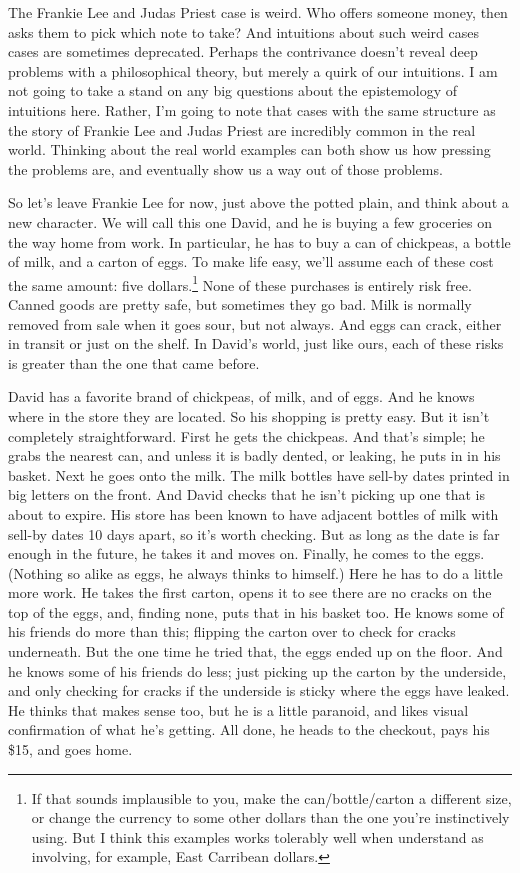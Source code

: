 \documentclass[
  10pt,
  letterpaper,
  DIV=11,
  numbers=noendperiod,
  twoside]{scrartcl}
\begin{document}
The Frankie Lee and Judas Priest case is weird. Who offers someone
money, then asks them to pick which note to take? And intuitions about
such weird cases cases are sometimes deprecated. Perhaps the contrivance
doesn't reveal deep problems with a philosophical theory, but merely a
quirk of our intuitions. I am not going to take a stand on any big
questions about the epistemology of intuitions here. Rather, I'm going
to note that cases with the same structure as the story of Frankie Lee
and Judas Priest are incredibly common in the real world. Thinking about
the real world examples can both show us how pressing the problems are,
and eventually show us a way out of those problems.

So let's leave Frankie Lee for now, just above the potted plain, and
think about a new character. We will call this one David, and he is
buying a few groceries on the way home from work. In particular, he has
to buy a can of chickpeas, a bottle of milk, and a carton of eggs. To
make life easy, we'll assume each of these cost the same amount: five
dollars.\footnote{If that sounds implausible to you, make the
  can/bottle/carton a different size, or change the currency to some
  other dollars than the one you're instinctively using. But I think
  this examples works tolerably well when understand as involving, for
  example, East Carribean dollars.} None of these purchases is entirely
risk free. Canned goods are pretty safe, but sometimes they go bad. Milk
is normally removed from sale when it goes sour, but not always. And
eggs can crack, either in transit or just on the shelf. In David's
world, just like ours, each of these risks is greater than the one that
came before.

David has a favorite brand of chickpeas, of milk, and of eggs. And he
knows where in the store they are located. So his shopping is pretty
easy. But it isn't completely straightforward. First he gets the
chickpeas. And that's simple; he grabs the nearest can, and unless it is
badly dented, or leaking, he puts in in his basket. Next he goes onto
the milk. The milk bottles have sell-by dates printed in big letters on
the front. And David checks that he isn't picking up one that is about
to expire. His store has been known to have adjacent bottles of milk
with sell-by dates 10 days apart, so it's worth checking. But as long as
the date is far enough in the future, he takes it and moves on. Finally,
he comes to the eggs. (Nothing so alike as eggs, he always thinks to
himself.) Here he has to do a little more work. He takes the first
carton, opens it to see there are no cracks on the top of the eggs, and,
finding none, puts that in his basket too. He knows some of his friends
do more than this; flipping the carton over to check for cracks
underneath. But the one time he tried that, the eggs ended up on the
floor. And he knows some of his friends do less; just picking up the
carton by the underside, and only checking for cracks if the underside
is sticky where the eggs have leaked. He thinks that makes sense too,
but he is a little paranoid, and likes visual confirmation of what he's
getting. All done, he heads to the checkout, pays his \$15, and goes
home.
\end{document}
